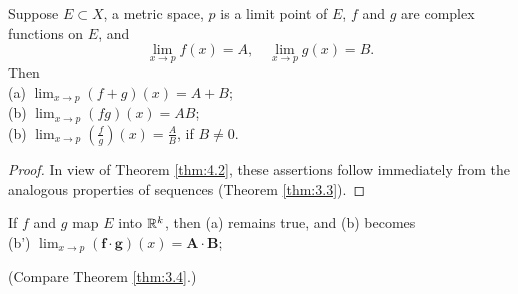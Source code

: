 \begin{thm}
    \label{thm:4.4}
    Suppose $E \subset X$, a metric space, $p$ is a limit point of $E$, $f$ and $g$ are complex functions on $E$, and
    \begin{equation*}
        \lim_{x \to p} f(x) = A, \quad
        \lim_{x \to p} g(x) = B.
    \end{equation*}
    Then \\
    (a) $\lim_{x \to p} (f + g)(x) = A + B$; \\
    (b) $\lim_{x \to p} (f   g)(x) = A   B$; \\
    (b) $\lim_{x \to p} (\frac{f}{g})(x) = \frac{A}{B}$, if $B \neq 0$. \\
\end{thm}

\begin{proof}
    In view of Theorem \ref{thm:4.2}, these assertions follow immediately from the analogous properties of sequences (Theorem \ref{thm:3.3}).
\end{proof}

\begin{myRemark}
    If $f$ and $g$ map $E$ into ${\protect\mathbb R}^{k}$, 
    then (a) remains true, and (b) becomes \\
    (b') $\lim_{x \to p} (\mathbf{f} \cdot \mathbf{g})(x) = \mathbf{A \cdot B}$;
\end{myRemark}

(Compare Theorem \ref{thm:3.4}.)